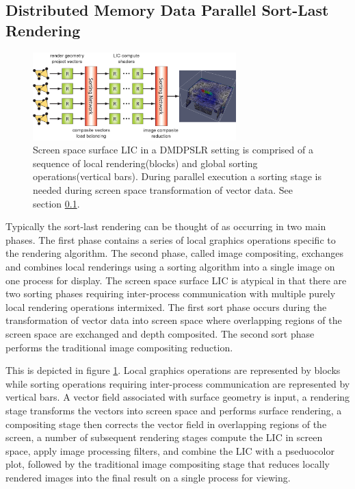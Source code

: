 \documentclass[a4paper,10pt]{article}
\begin{document}
\subsection{Distributed Memory Data Parallel Sort-Last Rendering}
\label{sec:DMDPSLR}
\begin{figure}
 \centering
 \includegraphics[width=0.7\textwidth]{render-sorting-plus-lic.png}
 \caption{Screen space surface LIC in a DMDPSLR setting is comprised of a sequence of local rendering(blocks) and global sorting operations(vertical bars). During parallel execution a sorting stage is needed during screen space transformation of vector data. See section \ref{sec:DMDPSLR}.}
 \label{fig:slr}
\end{figure}
Typically the sort-last rendering can be thought of as occurring in two main phases. The first phase contains a series of local graphics operations specific to the rendering algorithm. The second phase, called image compositing, exchanges and combines local renderings using a sorting algorithm into a single image on one process for display. The screen space surface LIC is atypical in that there are two sorting phases requiring inter-process communication with multiple purely local rendering operations intermixed. The first sort phase occurs during the transformation of vector data into screen space where overlapping regions of the screen space are exchanged and depth composited. The second sort phase performs the traditional image compositing reduction.

This is depicted in figure \ref{fig:slr}. Local graphics operations are represented by blocks while sorting operations requiring inter-process communication are represented by vertical bars. A vector field associated with surface geometry is input, a rendering stage transforms the vectors into screen space and performs surface rendering, a compositing stage then corrects the vector field in overlapping regions of the screen, a number of subsequent rendering stages compute the LIC in screen space, apply image processing filters, and combine the LIC with a pseduocolor plot, followed by the traditional image compositing stage that reduces locally rendered images into the final result on a single process for viewing. 
\end{document}
